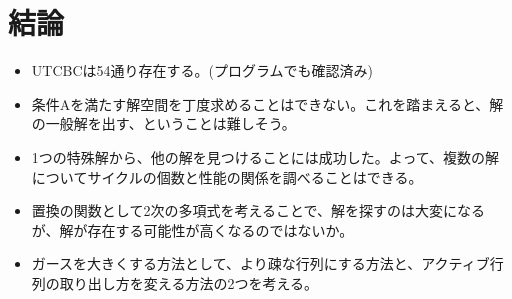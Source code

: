 \documentclass[a4paper,11pt,dvipdfmx]{jsarticle}
\theoremstyle{definition}
\begin{document}


\section{結論}
\begin{itemize}
  \item UTCBCは54通り存在する。(プログラムでも確認済み)
  \item 条件Aを満たす解空間を丁度求めることはできない。これを踏まえると、解の一般解を出す、ということは難しそう。
  \item 1つの特殊解から、他の解を見つけることには成功した。よって、複数の解についてサイクルの個数と性能の関係を調べることはできる。
  \item 置換の関数として2次の多項式を考えることで、解を探すのは大変になるが、解が存在する可能性が高くなるのではないか。
  \item ガースを大きくする方法として、より疎な行列にする方法と、アクティブ行列の取り出し方を変える方法の2つを考える。
\end{itemize}
\end{document}
